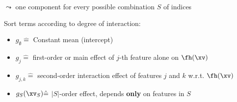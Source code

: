 \documentclass[11pt,compress,t,notes=noshow, aspectratio=169, xcolor=table]{beamer}
\newcommand{\open}{}
\newcommand{\close}{}
\begin{document}
\begin{frame}
\begin{definition}
$\leadsto$ one component for every possible combination $S$ of indices
\end{definition}
Sort terms according to degree of interaction:
\begin{itemize}
\item $g_{\open \emptyset \close} \hat = $ Constant mean (intercept) %
\item $g_{\open j \close} \hat = $ first-order or main effect of $j$-th feature alone on $\fh(\xv)$
\item $g_{\open j, k \close} \hat = $ second-order interaction effect of features $j$ and $k$ w.r.t. $\fh(\xv)$%
\item $g_{S}(\xv_S) \hat = $ $|S|$-order effect, depends \textbf{only} on features in $S$ %
\end{itemize}
\lz
\end{frame}

\end{document}

